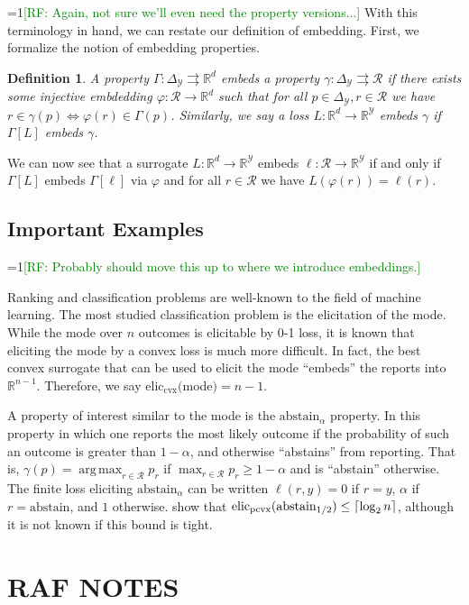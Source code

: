 \documentclass[12pt]{article}
\newcommand{\Comments}{1}
\newcommand{\mynote}[2]{\ifnum\Comments=1\textcolor{#1}{#2}\fi}
\newcommand{\raf}[1]{\mynote{green}{[RF: #1]}}
\newcommand{\reals}{\mathbb{R}}
\newcommand{\prop}[1]{\Gamma[#1]}
\newcommand{\eliccvx}{\mathrm{elic}_\mathrm{cvx}}
\newcommand{\elicpoly}{\mathrm{elic}_\mathrm{pcvx}}
\newcommand{\abstain}[1]{\mathrm{abstain}_{#1}}
\newcommand{\simplex}{\Delta_\Y}
\newcommand{\R}{\mathcal{R}}
\newcommand{\Y}{\mathcal{Y}}
\newcommand{\toto}{\rightrightarrows}
\DeclarePairedDelimiter\ceil{\lceil}{\rceil}
\DeclareMathOperator*{\argmax}{arg\,max}
\newtheorem{definition}{Definition}
\begin{document}
\raf{Again, not sure we'll even need the property versions...}
With this terminology in hand, we can restate our definition of embedding.
First, we formalize the notion of embedding properties.
\begin{definition}
  A property $\Gamma : \simplex \toto \reals^d$ \emph{embeds} a property $\gamma : \simplex \toto \R$ if there exists some injective embdedding $\varphi:\R\to\reals^d$ such that for all $p\in\simplex,r\in\R$ we have $r \in \gamma(p) \iff \varphi(r) \in \Gamma(p)$.
  Similarly, we say a loss $L:\reals^d\to\reals^\Y$ embeds $\gamma$ if $\prop{L}$ embeds $\gamma$.
\end{definition}
We can now see that a surrogate $L:\reals^d\to\reals^\Y$ embeds $\ell:\R\to\reals^\Y$ if and only if $\prop{L}$ embeds $\prop{\ell}$ via $\varphi$ and for all $r\in\R$ we have $L(\varphi(r)) = \ell(r)$.


\subsection{Important Examples}\label{sec:important-examples}
\raf{Probably should move this up to where we introduce embeddings.}

  Ranking and classification problems are well-known to the field of machine learning.
  The most studied classification problem is the elicitation of the mode.
  While the mode over $n$ outcomes is elicitable by 0-1 loss, it is known that eliciting the mode by a convex loss is much more difficult.
  In fact, the best convex surrogate that can be used to elicit the mode ``embeds'' the reports into $\reals^{n-1}$.
  Therefore, we say $\eliccvx($mode$) = n-1$.

  A property of interest similar to the mode is the $\abstain{\alpha}$ property.
  In this property in which one reports the most likely outcome if the probability of such an outcome is greater than $1-\alpha$, and otherwise ``abstains'' from reporting.
  That is, $\gamma(p) = \argmax_{r \in \R}p_r$ if $\max_{r \in \R} p_r \geq 1-\alpha$ and is ``abstain'' otherwise.
  The finite loss eliciting $\abstain{\alpha}$ can be written
  $\ell(r,y) = 0$ if $r=y$, $\alpha$ if $r=\text{abstain}$, and $1$ otherwise.
\cite{ramaswamy2018consistent} show that $\elicpoly(\abstain{1/2}) \leq \ceil{\log_2 n}$, although it is not known if this bound is tight.


\section*{RAF NOTES}
\end{document}
